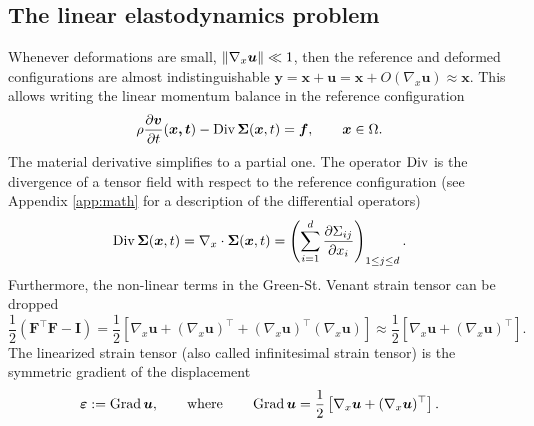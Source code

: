 \subsection{The linear elastodynamics problem}\label{sec:linElas}
Whenever deformations are small, $\left\|\nabla_x\bm{u}\right\| \ll 1$, then the reference and deformed configurations are almost indistinguishable $\bm{y} = \bm{x} + \bm{u} = \bm{x}  + O(\nabla_x\bm{u}) \approx \bm{x}$. This allows writing the linear momentum balance in the reference configuration
\begin{equation*}
	\rho \diffp{\bm{v}}{t}(\bm{x, t}) - \Div \bm\Sigma(\bm{x}, t) = \bm{f}, \qquad \bm{x} \in \Omega.
\end{equation*}
The material derivative simplifies to a partial one. The operator $\operatorname*{Div}$ is the divergence of a tensor field with respect to the reference configuration (see Appendix \ref{app:math} for a description of the differential operators)
\begin{equation*}
\Div \bm\Sigma(\bm{x}, t) = \nabla_x \cdot \bm\Sigma(\bm{x}, t) = \left(\sum_{i=1}^{d}\diffp{\Sigma_{ij}}{x_i}\right)_{1 \leq j \leq d}.
\end{equation*}
Furthermore, the non-linear terms in the Green-St. Venant strain tensor can be dropped
\begin{equation*}
\frac{1}{2} (\bm{F}^\top \bm{F} - \bm{I}) = \frac{1}{2}\left[\nabla_x \bm{u} + (\nabla_x \bm{u})^\top + (\nabla_x \bm{u})^\top (\nabla_x \bm{u})\right]
\approx \frac{1}{2}\left[\nabla_x \bm{u} + (\nabla_x \bm{u})^\top\right].
\end{equation*}
The linearized strain tensor (also called infinitesimal strain tensor) is the symmetric gradient of the displacement
\begin{equation}
\bm{\varepsilon} := \operatorname*{Grad}\bm{u}, \qquad \text{where} \qquad \operatorname*{Grad}\bm{u} = \frac{1}{2}\left[\nabla_x \bm{u} + (\nabla_x \bm{u})^\top\right].
\end{equation}

